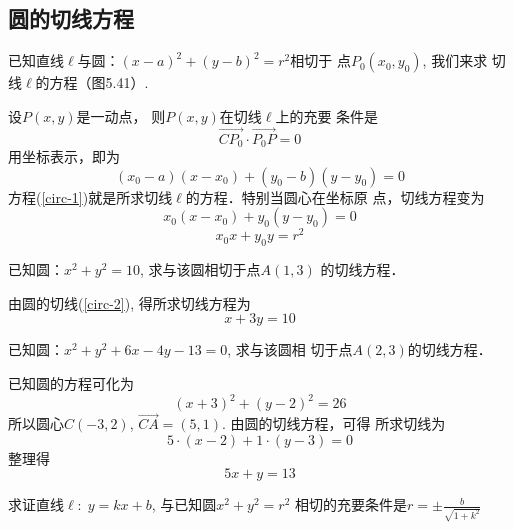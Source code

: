 \subsection{圆的切线方程}
已知直线$\ell$与圆：$(x-a)^2+(y-b)^2=r^2$相切于
点$P_0(x_0,y_0)$, 我们来求
切线$\ell$的方程（图5.41）.
\begin{figure}[htp]
    \centering
{}
    \caption{}
\end{figure}


设$P(x,y)$是一动点，
则$P(x,y)$在切线$\ell$上的充要
条件是
\[\Vec{CP_0}\cdot \Vec{P_0P}=0\]
用坐标表示，即为
\begin{equation}\label{circ-1}
    (x_0-a)(x-x_0)+(y_0-b)(y-y_0)=0
\end{equation}
方程(\ref{circ-1})就是所求切线$\ell$的方程．特别当圆心在坐标原
点，切线方程变为
\[x_0(x-x_0)+y_0(y-y_0)=0\]
\begin{equation}\label{circ-2}
    x_0x+y_0y=r^2
\end{equation}

\begin{example}
已知圆：$x^2+y^2=10$, 求与该圆相切于点$A(1,3)$
的切线方程．
\end{example}
    
\begin{solution}
由圆的切线(\ref{circ-2}), 得所求切线方程为
\[x+3y=10\]
\end{solution}

\begin{example}
已知圆：$x^2+y^2+6x-4y-13=0$, 求与该圆相
    切于点$A(2,3)$的切线方程．
\end{example}

\begin{solution}
已知圆的方程可化为
\[(x+3)^2+(y-2)^2=26\]
    所以圆心$C(-3,2)$, $\Vec{CA}=(5,1)$. 由圆的切线方程，可得
    所求切线为
\[    5\cdot (x-2)+1\cdot (y-3)=0\]
    整理得
\[    5x+y=13\]
\end{solution}

\begin{example}
    求证直线$\ell:\; y=kx+b$, 与已知圆$x^2+y^2=r^2$
相切的充要条件是$r=\pm\frac{b}{\sqrt{1+k^2}}$
\end{example}

